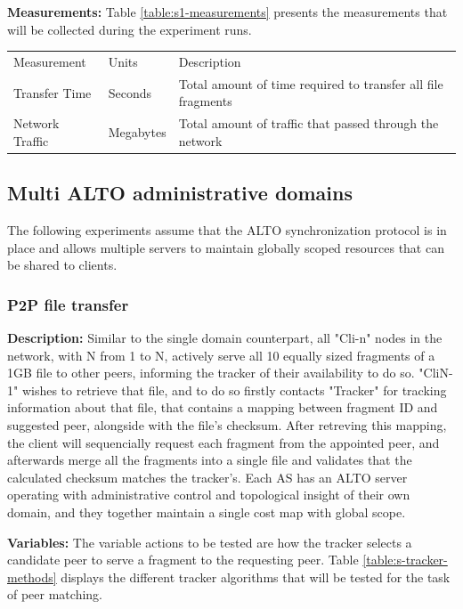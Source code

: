     \textbf{Measurements:} Table \ref{table:s1-measurements} presents the measurements that will be collected during the experiment runs.

\begin{table}[]
\begin{tabular}{lll}
Measurement     & Units     & Description                                                  \\
Transfer Time   & Seconds   & Total amount of time required to transfer all file fragments \\
Network Traffic & Megabytes & Total amount of traffic that passed through the network
\end{tabular}
\end{table}

\subsection{Multi ALTO administrative domains}

    The following experiments assume that the ALTO synchronization protocol is in place and allows multiple servers to maintain globally scoped resources that can be shared to clients.

\subsubsection{P2P file transfer}

    \textbf{Description:} Similar to the single domain counterpart, all "Cli-n" nodes in the network, with N from 1 to N, actively serve all 10 equally sized fragments of a 1GB file to other peers, informing the tracker of their availability to do so.
    "CliN-1" wishes to retrieve that file, and to do so firstly contacts "Tracker" for tracking information about that file, that contains a mapping between fragment ID and suggested peer, alongside with the file's checksum.
    After retreving this mapping, the client will sequencially request each fragment from the appointed peer, and afterwards merge all the fragments into a single file and validates that the calculated checksum matches the tracker's.
    Each AS has an ALTO server operating with administrative control and topological insight of their own domain, and they together maintain a single cost map with global scope.

    \textbf{Variables: } The variable actions to be tested are how the tracker selects a candidate peer to serve a fragment to the requesting peer.
Table \ref{table:s-tracker-methods} displays the different tracker algorithms that will be tested for the task of peer matching.

